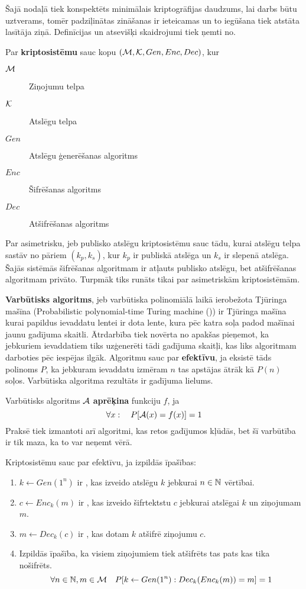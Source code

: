 Šajā nodaļā tiek konspektēts minimālais kriptogrāfijas daudzums, lai darbs būtu uztverams, tomēr padziļinātas zināšanas ir ieteicamas un to iegūšana tiek atstāta lasītāja ziņā. Definīcijas un atsevišķi skaidrojumi tiek ņemti no\cite{pass10}.

Par \textbf{kriptosistēmu} sauc kopu $(\mathcal{M}, \mathcal{K}, Gen, Enc, Dec)$, kur
\begin{description}
    \item[$\mathcal{M}$]Ziņojumu telpa
    \item[$\mathcal{K}$]Atslēgu telpa
    \item[$Gen$]Atslēgu ģenerēšanas algoritms
    \item[$Enc$]Šifrēšanas algoritms
    \item[$Dec$]Atšifrēšanas algoritms
\end{description}

Par asimetrisku, jeb publisko atslēgu kriptosistēmu sauc tādu, kurai atslēgu telpa sastāv no pāriem $(k_p, k_s)$, kur $k_p$ ir publiskā atslēga un $k_s$ ir slepenā atslēga. Šajās sistēmās šifrēšanas algoritmam ir atļauts publisko atslēgu, bet atšifrēšanas algoritmam privāto. Turpmāk tiks runāts tikai par asimetriskām kriptosistēmām.

\textbf{Varbūtisks algoritms}, jeb varbūtiska polinomiālā laikā ierobežota Tjūringa mašīna (Probabilistic polynomial-time Turing machine (\ppt)) ir Tjūringa mašīna kurai papildus ievaddatu lentei ir dota lente, kura pēc katra soļa padod mašīnai jaunu gadījuma skaitli. Ātrdarbība tiek novērta no apakšas pieņemot, ka jebkuriem ievaddatiem tiks uzģenerēti tādi gadījuma skaitļi, kas liks algoritmam darboties pēc iespējas ilgāk. Algoritmu sauc par \textbf{efektīvu}, ja eksistē tāds polinoms $P$, ka jebkuram ievaddatu izmēram $n$ tas apstājas ātrāk kā $P(n)$ soļos. Varbūtiska algoritma rezultāts ir gadījuma lielums.

Varbūtisks algoritms $\mathcal{A}$ \textbf{aprēķina} funkciju $f$, ja
$$ \forall x : \quad P[\mathcal{A}(x) = f(x)] = 1 $$
Praksē tiek izmantoti arī algoritmi, kas retos gadījumos kļūdās, bet šī varbūtība ir tik maza, ka to var neņemt vērā.

Kriptosistēmu sauc par efektīvu, ja izpildās īpašības:
\begin{enumerate}
    \item $k \leftarrow Gen(1^n)$ ir \ppt, kas izveido atslēgu $k$ jebkurai $n\in\mathbb{N}$ vērtībai.
    \item $c \leftarrow Enc_k(m)$ ir \ppt, kas izveido šifrtektstu $c$ jebkurai atslēgai $k$ un ziņojumam $m$.
    \item $m \leftarrow Dec_k(c)$ ir \ppt, kas dotam $k$ atšifrē ziņojumu $c$.
    \item Izpildās īpašība, ka visiem ziņojumiem tiek atšifrēts tas pats kas tika nošifrēts.
        $$ \forall n\in\mathbb{N}, m\in\mathcal{M} \quad P[k\leftarrow Gen(1^n): Dec_k(Enc_k(m)) = m] = 1 $$
\end{enumerate}

